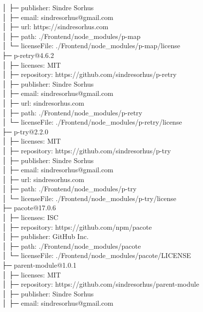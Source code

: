 \documentclass[
    paper=a4,
    twoside=false,
    parskip=half,
    listof=entryprefix,
    listof=totoc,
    index=totoc,
    bibliography=totoc,
    headsepline,
]{scrbook}
\begin{document}
    │  ├─ publisher: Sindre Sorhus\\
    │  ├─ email: sindresorhus@gmail.com\\
    │  ├─ url: https://sindresorhus.com\\
    │  ├─ path: ./Frontend/node\_modules/p-map\\
    │  └─ licenseFile: ./Frontend/node\_modules/p-map/license\\
    ├─ p-retry@4.6.2\\
    │  ├─ licenses: MIT\\
    │  ├─ repository: https://github.com/sindresorhus/p-retry\\
    │  ├─ publisher: Sindre Sorhus\\
    │  ├─ email: sindresorhus@gmail.com\\
    │  ├─ url: sindresorhus.com\\
    │  ├─ path: ./Frontend/node\_modules/p-retry\\
    │  └─ licenseFile: ./Frontend/node\_modules/p-retry/license\\
    ├─ p-try@2.2.0\\
    │  ├─ licenses: MIT\\
    │  ├─ repository: https://github.com/sindresorhus/p-try\\
    │  ├─ publisher: Sindre Sorhus\\
    │  ├─ email: sindresorhus@gmail.com\\
    │  ├─ url: sindresorhus.com\\
    │  ├─ path: ./Frontend/node\_modules/p-try\\
    │  └─ licenseFile: ./Frontend/node\_modules/p-try/license\\
    ├─ pacote@17.0.6\\
    │  ├─ licenses: ISC\\
    │  ├─ repository: https://github.com/npm/pacote\\
    │  ├─ publisher: GitHub Inc.\\
    │  ├─ path: ./Frontend/node\_modules/pacote\\
    │  └─ licenseFile: ./Frontend/node\_modules/pacote/LICENSE\\
    ├─ parent-module@1.0.1\\
    │  ├─ licenses: MIT\\
    │  ├─ repository: https://github.com/sindresorhus/parent-module\\
    │  ├─ publisher: Sindre Sorhus\\
    │  ├─ email: sindresorhus@gmail.com\\
\end{document}
